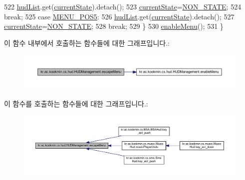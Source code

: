\begin{DoxyCode}
522         \hyperlink{classkr_1_1ac_1_1kookmin_1_1cs_1_1hud_1_1_h_u_d_management_a9eec206ae0d3464de9e92243ae0aba24}{hudList}.get(\hyperlink{classkr_1_1ac_1_1kookmin_1_1cs_1_1hud_1_1_h_u_d_management_a6e135a288ebdc4381eb971ab03d0bd6e}{currentState}).detach();
523         \hyperlink{classkr_1_1ac_1_1kookmin_1_1cs_1_1hud_1_1_h_u_d_management_a6e135a288ebdc4381eb971ab03d0bd6e}{currentState}=\hyperlink{classkr_1_1ac_1_1kookmin_1_1cs_1_1hud_1_1_h_u_d_management_aed0bc1b7b1fd78bb588e2321b44cb254}{NON\_STATE};
524         \textcolor{keywordflow}{break};
525       \textcolor{keywordflow}{case} \hyperlink{classkr_1_1ac_1_1kookmin_1_1cs_1_1hud_1_1_h_u_d_management_abfc1e4fd6ea23ecf49abfb86d47af051}{MENU\_POS5}:
526         \hyperlink{classkr_1_1ac_1_1kookmin_1_1cs_1_1hud_1_1_h_u_d_management_a9eec206ae0d3464de9e92243ae0aba24}{hudList}.get(\hyperlink{classkr_1_1ac_1_1kookmin_1_1cs_1_1hud_1_1_h_u_d_management_a6e135a288ebdc4381eb971ab03d0bd6e}{currentState}).detach();
527         \hyperlink{classkr_1_1ac_1_1kookmin_1_1cs_1_1hud_1_1_h_u_d_management_a6e135a288ebdc4381eb971ab03d0bd6e}{currentState}=\hyperlink{classkr_1_1ac_1_1kookmin_1_1cs_1_1hud_1_1_h_u_d_management_aed0bc1b7b1fd78bb588e2321b44cb254}{NON\_STATE};
528         \textcolor{keywordflow}{break};
529     \}
530     \hyperlink{classkr_1_1ac_1_1kookmin_1_1cs_1_1hud_1_1_h_u_d_management_a2d3e988e5636714778382ba504e00c6e}{enableMenu}(); 
531   \}
\end{DoxyCode}


이 함수 내부에서 호출하는 함수들에 대한 그래프입니다.\+:\nopagebreak
\begin{figure}[H]
\begin{center}
\leavevmode
\includegraphics[width=350pt]{classkr_1_1ac_1_1kookmin_1_1cs_1_1hud_1_1_h_u_d_management_af46086e2dbfc7fe58b45bc5d98fe08d8_cgraph}
\end{center}
\end{figure}




이 함수를 호출하는 함수들에 대한 그래프입니다.\+:\nopagebreak
\begin{figure}[H]
\begin{center}
\leavevmode
\includegraphics[width=350pt]{classkr_1_1ac_1_1kookmin_1_1cs_1_1hud_1_1_h_u_d_management_af46086e2dbfc7fe58b45bc5d98fe08d8_icgraph}
\end{center}
\end{figure}


